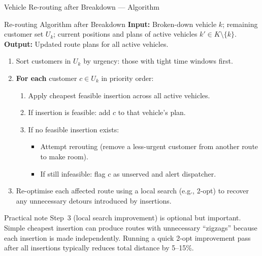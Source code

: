 \documentclass[aspectratio=169,10pt]{beamer}
\begin{document}
\begin{frame}[allowframebreaks]{Vehicle Re-routing after Breakdown — Algorithm}

  \begin{block}{Re-routing Algorithm after Breakdown}
    \textbf{Input:} Broken-down vehicle $k$; remaining customer set $U_k$;
    current positions and plans of active vehicles $k' \in K \setminus \{k\}$.\\
    \textbf{Output:} Updated route plans for all active vehicles.

    \medskip
    \begin{enumerate}
      \item Sort customers in $U_k$ by urgency:
            those with tight time windows first.
      \item \textbf{For each} customer $c \in U_k$ in priority order:
        \begin{enumerate}
          \item Apply cheapest feasible insertion across all active vehicles.
          \item If insertion is feasible: add $c$ to that vehicle's plan.
          \item If no feasible insertion exists:
                \begin{itemize}
                  \item Attempt rerouting (remove a less-urgent customer
                        from another route to make room).
                  \item If still infeasible: flag $c$ as unserved and alert dispatcher.
                \end{itemize}
        \end{enumerate}
      \item Re-optimise each affected route using a local search (e.g., 2-opt)
            to recover any unnecessary detours introduced by insertions.
    \end{enumerate}
  \end{block}

  \begin{alertblock}{Practical note}
    Step~3 (local search improvement) is optional but important.  Simple
    cheapest insertion can produce routes with unnecessary ``zigzags'' because
    each insertion is made independently.  Running a quick 2-opt improvement
    pass after all insertions typically reduces total distance by 5--15\%.
  \end{alertblock}

\end{frame}
\end{document}
